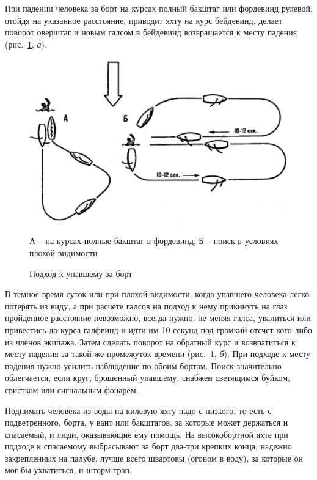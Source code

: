 \documentclass[a4paper, 12pt, twoside, final]{scrbook}
\begin{document}
При падении человека за борт на курсах полный бакштаг или фордевинд рулевой, отойдя на указанное расстояние, приводит яхту на курс бейдевинд, делает поворот оверштаг и новым галсом в бейдевинд возвращается к месту падения (рис.~\ref{fig:135}, \textit{а}). 

\begin{figure}[htbp]
   \centering
   \includegraphics{135_Podhod_upavshemu_za_bort} %
   \caption{Подход к упавшему за борт}
   \label{fig:135}
   \centering\small
   А \--- на курсах полные бакштаг в фордевинд, Б \--- поиск в условиях плохой видимости
\end{figure}

В темное время суток или при плохой видимости, когда упавшего человека легко потерять из виду, а при расчете галсов на подход к нему прикинуть на глаз пройденное расстояние невозможно, всегда нужно, не меняя галса, увалиться или привестись до курса галфвинд и идти им 10 секунд под громкий отсчет кого-либо из членов экипажа. Затем сделать поворот на обратный курс и возвратиться к месту падения за такой же промежуток времени (рис.~\ref{fig:135}, \textit{б}). При подходе к месту падения нужно усилить наблюдение по обоим бортам. Поиск значительно облегчается, если круг, брошенный упавшему, снабжен светящимся буйком, свистком или сигнальным фонарем.

Поднимать человека из воды на килевую яхту надо с низкого, то есть с подветренного, борта, у вант или бакштагов. за которые может держаться и спасаемый, и люди, оказывающие ему помощь. На высокобортной яхте при подходе к спасаемому выбрасывают за борт два\--три крепких конца, надежно закрепленных на палубе, лучше всего швартовы (огоном в воду), за которые он мог бы ухватиться, и шторм-трап.
\end{document}
